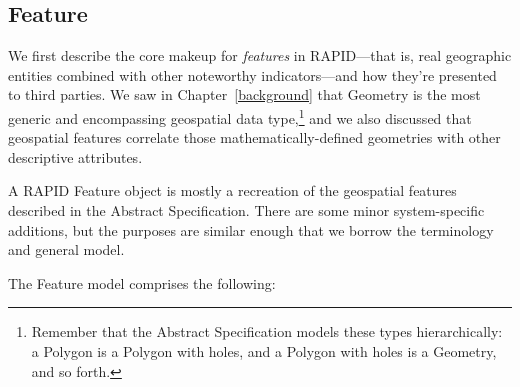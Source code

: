 \subsection{Feature}
We first describe the core makeup for \textit{features} in RAPID---that is, real geographic entities combined with other noteworthy indicators---and how they're presented to third parties. We saw in Chapter~\ref{background} that Geometry is the most generic and encompassing geospatial data type,\footnote{Remember that the Abstract Specification models these types hierarchically: a Polygon is a Polygon with holes, and a Polygon with holes is a Geometry, and so forth.} and we also discussed that geospatial features correlate those mathematically-defined geometries with other descriptive attributes.

A RAPID Feature object is mostly a recreation of the geospatial features described in the Abstract Specification. There are some minor system-specific additions, but the purposes are similar enough that we borrow the terminology and general model.

The Feature model comprises the following:

